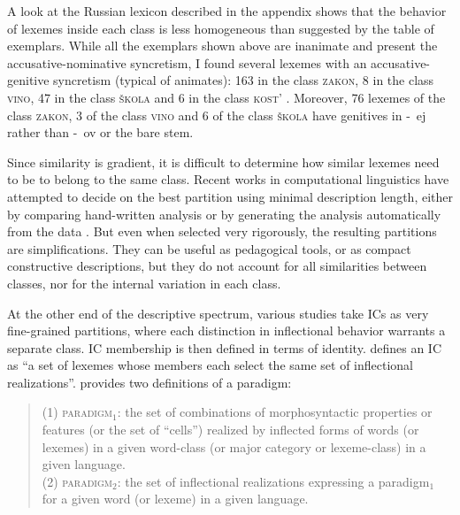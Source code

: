 \documentclass[output=paper]{langscibook}
\begin{document}
    A look at the Russian lexicon described in the appendix shows that the behavior of lexemes inside each class is less homogeneous than suggested by the table of exemplars. While all the exemplars shown above are inanimate and present the accusative-nominative syncretism, I found several lexemes with an accusative-genitive syncretism (typical of animates): 163 in the class \textsc{zakon}, 8 in the class \textsc{vino}, 47 in the class \textsc{škola} and 6 in the class \textsc{kost'} \citep[see][129]{CorbettFraser1993}. Moreover, 76 lexemes of the class \textsc{zakon}, 3 of the class \textsc{vino} and 6 of the class \textsc{škola} have genitives in \unit{-ej} rather than \unit{-ov} or the bare stem.

    Since similarity is gradient, it is difficult to determine how similar lexemes need to be to belong to the same class. Recent works in computational linguistics have attempted to decide on the best partition using minimal description length, either by comparing hand-written analysis \citep{WaltherSagot2011} or by generating the analysis automatically from the data \citep{BeniamineBonamiSagot2017}. But even when selected very rigorously, the resulting partitions are simplifications. They can be useful as pedagogical tools, or as compact constructive descriptions, but they do not account for all similarities between classes, nor for the internal variation in each class.

    At the other end of the descriptive spectrum, various studies take ICs as very fine-grained partitions, where each distinction in inflectional behavior warrants a separate class. IC membership is then defined in terms of identity. \citet[64]{Aronoff1994} defines an IC as ``a set of lexemes whose members each select the same set of inflectional realizations''. \citet[739]{Carstairs-McCarthy1994} provides two definitions of a paradigm:

    \blockquote{%
        (1) \textsc{paradigm$_{1}$}: the set of combinations of morphosyntactic properties or features (or the set of ``cells'') realized by inflected forms of words (or lexemes) in a given word-class (or major category or lexeme-class) in a given language.\\
        (2) \textsc{paradigm$_{2}$}: the set of inflectional realizations expressing a paradigm$_{1}$ for a given word (or lexeme) in a given language.
    }
\end{document}
